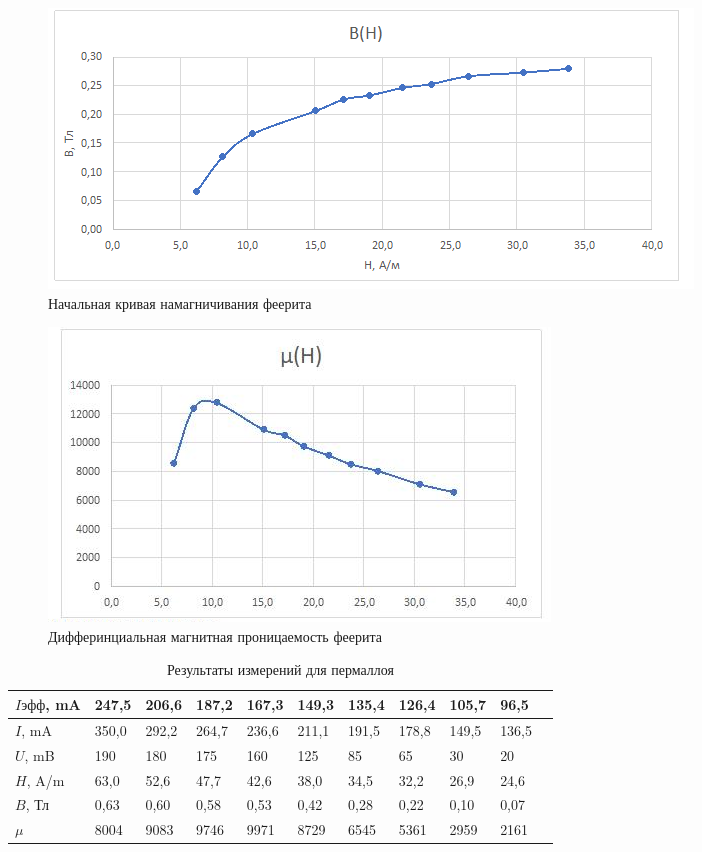 \documentclass[a4paper, 12pt]{article}
\begin{document}
\begin{enumerate}
\begin{figure}[H]
    \centering
    \includegraphics[scale=0.7]{феррит1.png}
    \caption{Начальная кривая намагничивания феерита}
    \label{fig:scheme}
\end{figure}

\begin{figure}[H]
    \centering
    \includegraphics[scale=0.7]{феррит2.png}
    \caption{ Дифферинциальная магнитная проницаемость феерита}
    \label{fig:scheme}
\end{figure}

\begin{table}[h]
\centering
\begin{tabular}{|l|l|l|l|l|l|l|l|l|l|l|}
\hline
$I эфф$, mA & 247,5 & 206,6 & 187,2 & 167,3 & 149,3 & 135,4 & 126,4 & 105,7 & 96,5  \\ \hline
$I$, mA & 350,0 & 292,2 & 264,7 & 236,6 & 211,1 & 191,5 & 178,8 & 149,5 & 136,5  \\ \hline
$U$, mB & 190 & 180 & 175 & 160 & 125 & 85 & 65 & 30 & 20  \\ \hline
$H$, A/m & 63,0 & 52,6 & 47,7 & 42,6 & 38,0 & 34,5 & 32,2 & 26,9 & 24,6  \\ \hline
$B$, Тл & 0,63 & 0,60 & 0,58 & 0,53 & 0,42 & 0,28 & 0,22 & 0,10 & 0,07   \\ \hline
$\mu$ & 8004 & 9083 & 9746 & 9971 & 8729 & 6545 & 5361 & 2959 & 2161   \\ \hline
\end{tabular}
\caption{Результаты измерений для пермаллоя}
\end{table}


\end{enumerate}
\end{document}
